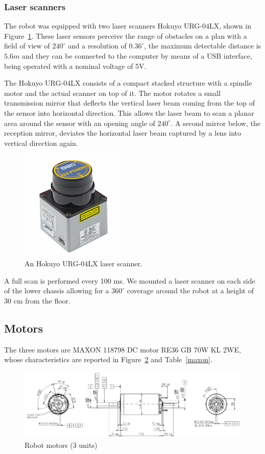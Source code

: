 \subsubsection{Laser scanners}\label{lasershokuyo}
The robot was equipped with two laser scanners Hokuyo URG-04LX, shown in Figure~\ref{fig:hokuyo}. These laser sensors perceive the range of obstacles on a plan with a field of view of $240^\circ$ and a resolution of $0.36^\circ$, the maximum detectable distance is $5.6m$ and they can be connected to the computer by means of a USB interface, being operated with a nominal voltage of 5V.

The Hokuyo URG-04LX consists of a compact stacked structure with a spindle motor and the actual scanner on top of it. The motor rotates a small transmission mirror that deflects the vertical laser beam coming from the top of the sensor into horizontal direction. This allows the laser beam to scan a planar area around the sensor with an opening angle of $240^\circ$. A second mirror below, the reception mirror, deviates the horizontal laser beam captured by a lens into vertical direction again.

\begin{figure}[H]
	\centering
	\includegraphics[width=5cm]{images/03-foundation/hokuyo}
	\caption{ An Hokuyo URG-04LX laser scanner.}
	\label{fig:hokuyo} 
\end{figure}

A full scan is performed every 100 ms. We mounted a laser scanner on each side of the lower chassis allowing for a $360^\circ$ coverage around the robot at a height of 30 cm from the floor.

\subsection{Motors}
The three motors are MAXON 118798 DC motor RE36 GB 70W KL 2WE, whose characteristics are reported in Figure~\ref{motor} and Table~\ref{maxon}.

\begin{figure}[H]
	\centering
	\includegraphics[width=\textwidth]{images/03-foundation/motor}
	\caption{Robot motors (3 units)}
	\label{motor} 
\end{figure}

